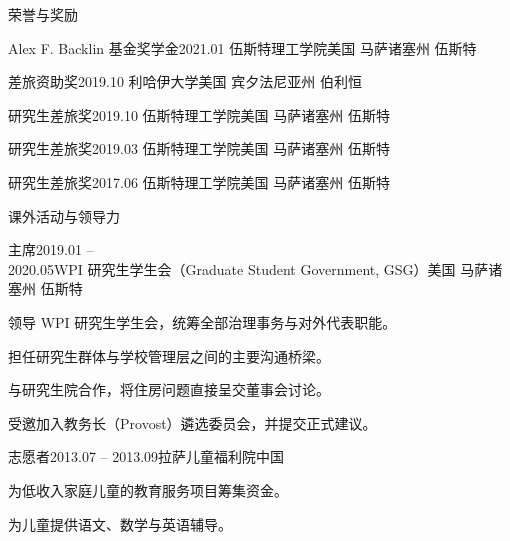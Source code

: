 \documentclass{resume}
\begin{document}
\begin{rSection}{荣誉与奖励}

\begin{nSubsection}
{Alex F. Backlin 基金奖学金}{2021.01}
{伍斯特理工学院}{美国 马萨诸塞州 伍斯特}
\end{nSubsection}

\begin{nSubsection}
{差旅资助奖}{2019.10}
{利哈伊大学}{美国 宾夕法尼亚州 伯利恒}
\end{nSubsection}

\begin{nSubsection}
{研究生差旅奖}{2019.10}
{伍斯特理工学院}{美国 马萨诸塞州 伍斯特}
\end{nSubsection}

\begin{nSubsection}
{研究生差旅奖}{2019.03}
{伍斯特理工学院}{美国 马萨诸塞州 伍斯特}
\end{nSubsection}

\begin{nSubsection}
{研究生差旅奖}{2017.06}
{伍斯特理工学院}{美国 马萨诸塞州 伍斯特}
\end{nSubsection}

\end{rSection}

\begin{rSection}{课外活动与领导力}

\begin{rSubsection}{主席}{2019.01 -- 2020.05}{WPI 研究生学生会（Graduate Student Government, GSG）}{美国 马萨诸塞州 伍斯特}
\item 领导 WPI 研究生学生会，统筹全部治理事务与对外代表职能。
\item 担任研究生群体与学校管理层之间的主要沟通桥梁。
\item 与研究生院合作，将住房问题直接呈交董事会讨论。
\item 受邀加入教务长（Provost）遴选委员会，并提交正式建议。
\end{rSubsection}

\begin{rSubsection}{志愿者}{2013.07 -- 2013.09}{拉萨儿童福利院}{中国}
\item 为低收入家庭儿童的教育服务项目筹集资金。
\item 为儿童提供语文、数学与英语辅导。
\end{rSubsection}

\end{rSection}
\end{document}
